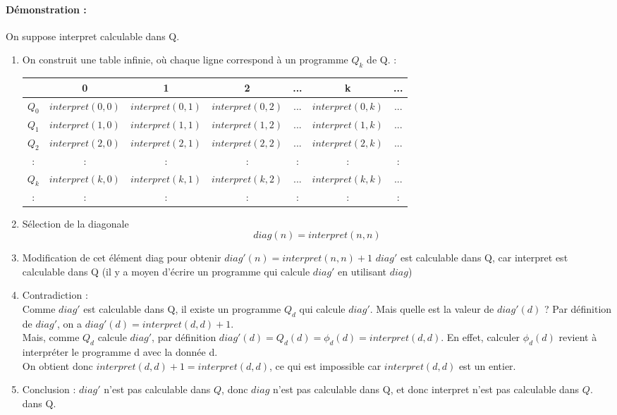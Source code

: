 \paragraph{Démonstration :}
On suppose interpret calculable dans Q.
\begin{enumerate}
	\item On construit une table infinie, où chaque ligne correspond à un programme $Q_k$ de Q.   : \\
		\begin{tabular}{|c||c|c|c|c|c|c|}
			\hline
			& 0 & 1 & 2 & ... & k & ... \\
			\hline
			$Q_0$ & $interpret(0,0)$ & $interpret(0,1)$ & $interpret(0,2)$ & ... & $interpret(0,k)$ & ... \\
			$Q_1$ & $interpret(1,0)$ & $interpret(1,1)$ & $interpret(1,2)$ & ... & $interpret(1,k)$ & ... \\
			$Q_2$ & $interpret(2,0)$ & $interpret(2,1)$ & $interpret(2,2)$ & ... & $interpret(2,k)$ & ... \\
			: & : &:& : & : & : &:\\
			$Q_k$ & $interpret(k,0)$ & $interpret(k,1)$ & $interpret(k,2)$ & ... & $interpret(k,k)$ & ... \\
			: & : &:& : & : & : &:\\
			\hline
		\end{tabular}
	\item Sélection de la diagonale
		\[diag(n) = interpret(n,n)\]
	\item Modification de cet élément diag pour obtenir
		$diag'(n) = interpret(n,n)+1$
		$diag'$ est calculable dans Q, car interpret est calculable dans Q (il y a moyen
		d'écrire un programme qui calcule $diag'$ en utilisant $diag$)
	\item Contradiction :\\
	       	Comme $diag'$ est calculable dans Q, il existe un programme $Q_d$ qui calcule $diag'$.  
		Mais quelle est la valeur de $diag'(d)$ ?
		Par définition de $diag'$, on a $diag'(d) = interpret(d,d)+1$. \\
		Mais, comme $Q_d$ calcule $diag'$, par définition $diag'(d) = Q_d(d) = \phi_d(d) = interpret(d,d)$.
		En effet, calculer $\phi_d(d)$ revient à interpréter le programme
		d avec la donnée d. \\
		On obtient donc $interpret(d,d)+1 = interpret(d,d)$, ce qui est impossible car $interpret(d,d)$ est un entier. 
	\item Conclusion : $diag'$ n'est pas calculable dans $Q$, donc $diag$
	n'est pas calculable dans Q, et donc interpret n'est pas calculable dans $Q$.
dans Q.
\end{enumerate}

